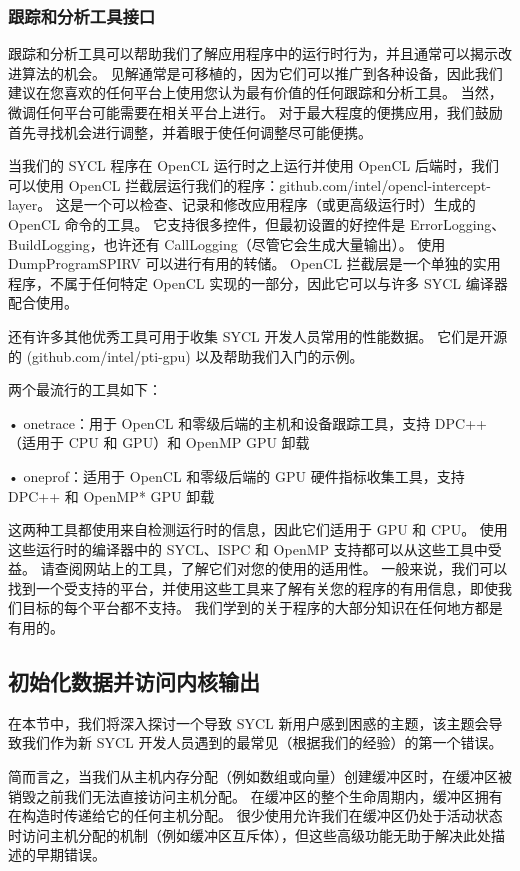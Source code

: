 \subsubsection{跟踪和分析工具接口}
跟踪和分析工具可以帮助我们了解应用程序中的运行时行为，并且通常可以揭示改进算法的机会。 见解通常是可移植的，因为它们可以推广到各种设备，因此我们建议在您喜欢的任何平台上使用您认为最有价值的任何跟踪和分析工具。 当然，微调任何平台可能需要在相关平台上进行。 对于最大程度的便携应用，我们鼓励首先寻找机会进行调整，并着眼于使任何调整尽可能便携。

当我们的 SYCL 程序在 OpenCL 运行时之上运行并使用 OpenCL 后端时，我们可以使用 OpenCL 拦截层运行我们的程序：github.com/intel/opencl-intercept-layer。 这是一个可以检查、记录和修改应用程序（或更高级运行时）生成的 OpenCL 命令的工具。 它支持很多控件，但最初设置的好控件是 ErrorLogging、BuildLogging，也许还有 CallLogging（尽管它会生成大量输出）。 使用 DumpProgramSPIRV 可以进行有用的转储。 OpenCL 拦截层是一个单独的实用程序，不属于任何特定 OpenCL 实现的一部分，因此它可以与许多 SYCL 编译器配合使用。

还有许多其他优秀工具可用于收集 SYCL 开发人员常用的性能数据。 它们是开源的 (github.com/intel/pti-gpu) 以及帮助我们入门的示例。

两个最流行的工具如下：

• onetrace：用于 OpenCL 和零级后端的主机和设备跟踪工具，支持 DPC++（适用于 CPU 和 GPU）和 OpenMP GPU 卸载

• oneprof：适用于 OpenCL 和零级后端的 GPU 硬件指标收集工具，支持 DPC++ 和 OpenMP* GPU 卸载

这两种工具都使用来自检测运行时的信息，因此它们适用于 GPU 和 CPU。 使用这些运行时的编译器中的 SYCL、ISPC 和 OpenMP 支持都可以从这些工具中受益。 请查阅网站上的工具，了解它们对您的使用的适用性。 一般来说，我们可以找到一个受支持的平台，并使用这些工具来了解有关您的程序的有用信息，即使我们目标的每个平台都不支持。 我们学到的关于程序的大部分知识在任何地方都是有用的。

\subsection{初始化数据并访问内核输出}
在本节中，我们将深入探讨一个导致 SYCL 新用户感到困惑的主题，该主题会导致我们作为新 SYCL 开发人员遇到的最常见（根据我们的经验）的第一个错误。

简而言之，当我们从主机内存分配（例如数组或向量）创建缓冲区时，在缓冲区被销毁之前我们无法直接访问主机分配。 在缓冲区的整个生命周期内，缓冲区拥有在构造时传递给它的任何主机分配。 很少使用允许我们在缓冲区仍处于活动状态时访问主机分配的机制（例如缓冲区互斥体），但这些高级功能无助于解决此处描述的早期错误。

